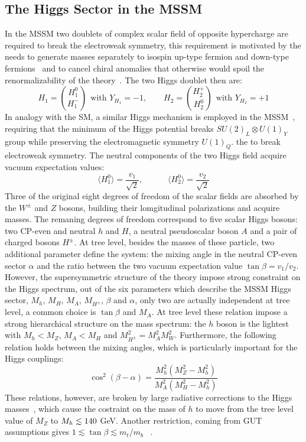 \subsection{The Higgs Sector in the MSSM }
In the MSSM two doublets of complex scalar field of opposite hypercharge are required to break the electroweak symmetry, 
this requirement is motivated by the needs to generate  masses separately to isospin up-type fermion and down-type fermions~\cite{djouadiP21}
and to cancel chiral anomalies that otherwise would spoil the renormalizability of the theory~\cite{djouadiP21}. The two Higgs doublet then are:
\begin{equation}
H_1 = \binom{H_1^0}{H_1^-} ~ ~ \text{with } Y_{H_1} = -1, \quad \quad H_2 = \binom{H_2^+}{H_2^0} ~ ~ \text{with } Y_{H_2} = +1  
\end{equation}
In analogy with the SM, a similar Higgs mechanism is employed in the MSSM~\cite{djuadiP22},  requiring that the minimum 
of the Higgs potential breaks $SU(2)_L \otimes U(1)_Y$ group while preserving the electromagnetic symmetry $U(1)_Q$.
the  to break electroweak symmetry. The neutral components of the 
two Higgs field acquire vacuum expectation values:
\begin{equation}
\langle H_1^0 \rangle = \frac{v_1}{\sqrt{2}}, \quad \quad \quad  \langle H_2^0 \rangle = \frac{v_2}{\sqrt{2}}
\end{equation}
Three of the original eight degrees of freedom of the scalar fields are absorbed by the $W^{\pm}$ and $Z$ bosons, building their lomgitudinal
polarizations and acquire masses. The remaning degrees of freedom correspond to five scalar Higgs bosons: two CP-even and neutral $h$ and $H$, 
a neutral pseudoscalar boson $A$ and a pair of charged bosons $H^{\pm}$. At tree level, besides the masses of these particle, two additional parameter
define the system: the mixing angle in the neutral CP-even sector $\alpha$ and the ratio between the two vacuum expectation value $\tan \beta = v_1/v_2$.
However, the supersymmetric structure of the theory impose strong constraint on the Higgs spectrum, out of the six parameters which describe 
the MSSM Higgs sector, $M_h$, $M_H$, $M_A$, $M_{H^\pm}$, $\beta$ and $\alpha$, only two  are actually independent at tree level, a common choice 
is $\tan \beta$ and $M_A$. At tree level these relation impose a strong hierarchical structure on the mass spectrum: the $h$ boson is the lightest
with  $M_h < M_Z$,  $M_A < M_H$ and $M_{H^\pm}^2 = M_A^2 M_W^2$. Furthermore, the following relation holds between the mixing angles, which is particularly important
for the Higgs couplings:
\begin{equation}
\cos^2(\beta - \alpha) = \frac{M_h^2 (M_Z^2 - M_h^2)}{M_A^2 (M_H^2 - M_h^2)}
\end{equation}
These relations, however, are broken by large radiative corrections to the Higgs 
masses~\cite{djuadiPage6}, which cause the costraint on the mass of $h$ to move from the tree level value of $M_Z$ to $\mh \apprle 140$ GeV.
Another restriction, coming from GUT assumptions gives $1 \apprle \tan \beta \apprle m_t/m_b$ ~\cite{sebpage27}.


